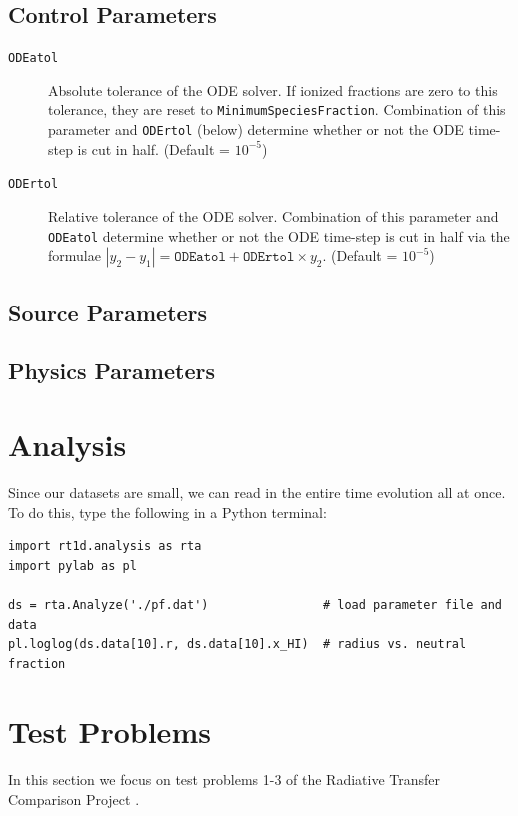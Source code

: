 \documentclass[letterpaper,titlepage,12pt]{article}
\numberwithin{equation}{section}
\begin{document}
\subsection{Control Parameters}

\begin{description}
    
\item [\texttt{ODEatol}] Absolute tolerance of the ODE solver.  If ionized fractions are zero to this tolerance, they are reset to \texttt{MinimumSpeciesFraction}.  Combination of this parameter and \texttt{ODErtol} (below) determine whether or not the ODE time-step is cut in half. (Default = $10^{-5}$)

\item [\texttt{ODErtol}]
Relative tolerance of the ODE solver.  Combination of this parameter and \texttt{ODEatol} determine whether or not the ODE time-step is cut in half via the formulae $|y_2 - y_1| = \texttt{ODEatol} + \texttt{ODErtol}\times y_2$. (Default = $10^{-5}$)
 

\end{description}


\subsection{Source Parameters}


\subsection{Physics Parameters} \label{sec:PhysicsParameters}


\section{Analysis}
Since our datasets are small, we can read in the entire time evolution all at once.  To do this, type the following in a Python terminal:
\begin{verbatim}
import rt1d.analysis as rta
import pylab as pl

ds = rta.Analyze('./pf.dat')                # load parameter file and data
pl.loglog(ds.data[10].r, ds.data[10].x_HI)  # radius vs. neutral fraction
\end{verbatim}

\section{Test Problems}
In this section we focus on test problems 1-3 of the Radiative Transfer Comparison Project \citep[hereafter RT06;][]{Iliev2006}.
\end{document}
